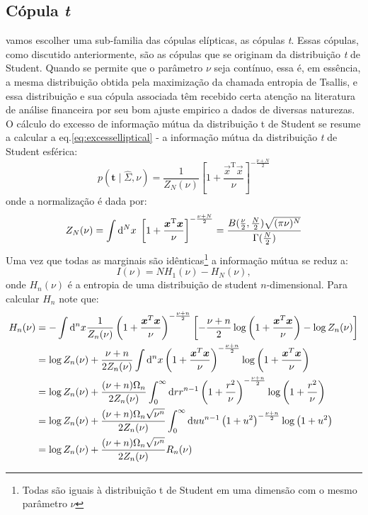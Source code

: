 \subsection{Cópula \textit{t}}
 vamos escolher uma sub-familia das cópulas elípticas, as cópulas \textit{t}. Essas cópulas, como discutido anteriormente, são as cópulas que se originam da distribuição \textit{t} de Student. Quando se permite que o parâmetro $\nu$ seja contínuo, essa é, em essência, a mesma distribuição obtida pela maximização da chamada entropia de Tsallis, e essa distribuição e sua cópula associada têm recebido certa atenção na literatura de análise financeira por seu bom ajuste empirico a dados de diversas naturezas\cite{Demarta2005, Borland2002}. O cálculo do excesso de informação mútua da distribuição t de Student se resume a calcular a eq.\eqref{eq:excesselliptical} - a informação mútua da distribuição \textit{t} de Student esférica:
\begin{equation}
	p(\mathbf{t}\mid \hat{\Sigma},\nu) =  \frac{1}{Z_{N}(\nu)}\left[1+ \frac{\vec{x}^{\mathrm{T}}\vec{x}}{\nu}\right]^{-\frac{\nu+N}{2}}
\end{equation}
onde a normalização é dada por:
\begin{equation}
  Z_N(\nu) = \int \mathrm{d}^N x \;\left[1+ \frac{\bm{x}^{\mathrm{T}}\bm{x}}{\nu}\right]^{-\frac{\nu+N}{2}} =  \frac{B(\frac{\nu}{2},\frac{N}{2})\sqrt{(\pi\nu)^{N}}}{\Gamma(\frac{N}{2})}
\end{equation}
Uma vez que todas as marginais são idênticas\footnote{Todas são iguais à distribuição t de Student em uma dimensão com o mesmo parâmetro $\nu$} a informação mútua se reduz a:
\begin{equation}
 I(\nu) =  N H_{1}(\nu) - H_{N}(\nu),
\end{equation}
onde $H_n(\nu)$ é a entropia de uma distribuição de student $n$-dimensional. Para calcular $H_n$ note que:
\begin{align*}
H_n(\nu) &= -\int \mathrm{d}^n x \frac{1}{Z_n(\nu)} \left(1 + \frac{\bm{x}^T\bm{x}}{\nu}\right)^{-\frac{\nu+n}{2}} \left[-\frac{\nu+n}{2} \log\left(1 + \frac{\bm{x}^T\bm{x}}{\nu}\right) -\log Z_n(\nu)\right] \\
	 &= \log Z_n(\nu) + \frac{\nu+n}{2Z_n(\nu)} \int \mathrm{d}^n x \left(1 + \frac{\bm{x}^T\bm{x}}{\nu}\right)^{-\frac{\nu+n}{2}} \log\left(1 + \frac{\bm{x}^T\bm{x}}{\nu}\right) \\
	 &= \log Z_n(\nu) + \frac{(\nu+n)\Omega_{n}}{2Z_n(\nu)}  \int_{0}^\infty \mathrm{d} r r^{n-1} \left(1+\frac{r^2}{\nu}\right)^{-\frac{\nu+n}{2}}\log\left(1 + \frac{r^2}{\nu}\right)\\
	 &= \log Z_n(\nu) + \frac{(\nu+n)\Omega_{n}\sqrt{\nu^n}}{2Z_n(\nu)}  \int_{0}^\infty \mathrm{d} u u^{n-1} \left(1+u^2\right)^{-\frac{\nu+n}{2}}\log\left(1 + u^2\right)\\
	 &= \log Z_n(\nu) + \frac{(\nu+n)\Omega_{n}\sqrt{\nu^n}}{2Z_n(\nu)}  R_n(\nu)
\end{align*}
